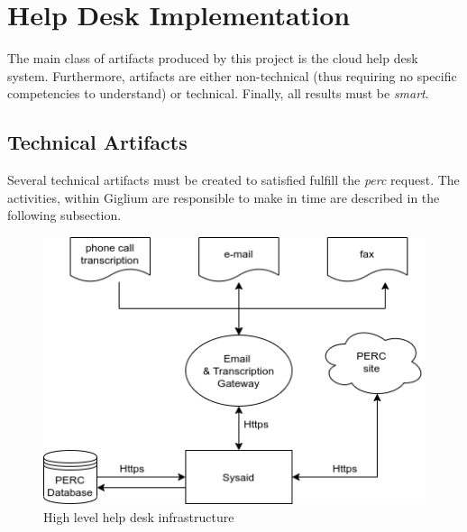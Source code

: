 \clearpage
\section{Help Desk Implementation}\label{implementation}
The main class of artifacts produced by this project is the cloud help desk system. Furthermore, artifacts are either non-technical (thus requiring no specific competencies to understand) or technical. Finally, all results must be \textit{\gls{smart}}.

\subsection{Technical Artifacts}\label{technical}
Several technical artifacts must be created to satisfied fulfill the \textit{\gls{perc}} request. The activities, within Giglium are responsible to make in time are described in the following subsection.

\begin{figure}[ht!]
	\centering
	\includegraphics[width=120mm]{./img/implementations/infrastructure.png}
	\caption{High level help desk infrastructure}\label{fig:high-level-help-desk-infrastructure}
\end{figure}

